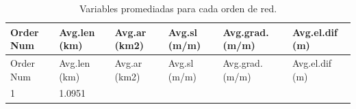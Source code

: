 \documentclass[11pt,]{article}
\begin{document}
\begin{longtable}[]{@{}llllll@{}}
\caption{\label{tablacuatro}Variables promediadas para cada orden de
red.}\tabularnewline
\toprule
\begin{minipage}[b]{0.12\columnwidth}\raggedright\strut
Order Num\strut
\end{minipage} & \begin{minipage}[b]{0.13\columnwidth}\raggedright\strut
Avg.len (km)\strut
\end{minipage} & \begin{minipage}[b]{0.13\columnwidth}\raggedright\strut
Avg.ar (km2)\strut
\end{minipage} & \begin{minipage}[b]{0.13\columnwidth}\raggedright\strut
Avg.sl (m/m)\strut
\end{minipage} & \begin{minipage}[b]{0.16\columnwidth}\raggedright\strut
Avg.grad. (m/m)\strut
\end{minipage} & \begin{minipage}[b]{0.15\columnwidth}\raggedright\strut
Avg.el.dif (m)\strut
\end{minipage}\tabularnewline
\midrule
\endfirsthead
\toprule
\begin{minipage}[b]{0.12\columnwidth}\raggedright\strut
Order Num\strut
\end{minipage} & \begin{minipage}[b]{0.13\columnwidth}\raggedright\strut
Avg.len (km)\strut
\end{minipage} & \begin{minipage}[b]{0.13\columnwidth}\raggedright\strut
Avg.ar (km2)\strut
\end{minipage} & \begin{minipage}[b]{0.13\columnwidth}\raggedright\strut
Avg.sl (m/m)\strut
\end{minipage} & \begin{minipage}[b]{0.16\columnwidth}\raggedright\strut
Avg.grad. (m/m)\strut
\end{minipage} & \begin{minipage}[b]{0.15\columnwidth}\raggedright\strut
Avg.el.dif (m)\strut
\end{minipage}\tabularnewline
\midrule
\endhead
\begin{minipage}[t]{0.12\columnwidth}\raggedright\strut
1\strut
\end{minipage} & \begin{minipage}[t]{0.13\columnwidth}\raggedright\strut
1.0951\strut
\end{minipage} & \begin{minipage}[t]{0.13\columnwidth}\raggedright\strut

\end{minipage}
\end{longtable}
\end{document}
